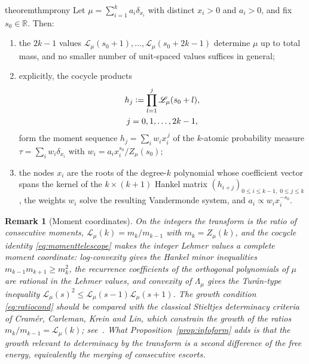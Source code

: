\documentclass[sn-mathphys-num]{sn-jnl}
\theoremstyle{thmstyleone}%
\theoremstyle{thmstyletwo}%
\newtheorem{remark}{Remark}%
\theoremstyle{thmstylethree}%
\theoremstyle{thmstyleone}%
\providecommand{\R}{\mathbb{R}}
\providecommand{\Leh}{\mathscr{L}}
\providecommand{\eqdef}{\mathrel{\vcentcolon=}}
\begin{document}
	\begin{restatable}{theorem}{thmprony}
		\label{thm:prony}
		Let $\mu=\sum_{i=1}^{k}a_i\delta_{x_i}$ with distinct $x_i>0$ and
		$a_i>0$, and fix $s_0\in\R$. Then:
		\begin{enumerate}[label=\textup{(\roman*)},leftmargin=2.2em]
			\item the $2k-1$ values
			$\Leh_\mu(s_0+1),\dots,\Leh_\mu(s_0+2k-1)$ determine $\mu$ up
			to total mass, and no smaller number of unit-spaced values
			suffices in general;
			\item explicitly, the cocycle products
			\begin{equation}\label{eq:hj}
				\begin{gathered}
					h_j\eqdef\prod_{l=1}^{j}\Leh_\mu(s_0+l),\\
					j=0,1,\dots,2k-1,
				\end{gathered}
			\end{equation}
			form the moment sequence $h_j=\sum_iw_ix_i^{\,j}$ of the
			$k$-atomic probability measure
			$\tau=\sum_iw_i\delta_{x_i}$ with
			$w_i=a_ix_i^{s_0}/Z_\mu(s_0)$;
			\item the nodes $x_i$ are the roots of the degree-$k$
			polynomial whose coefficient vector spans the kernel of the
			$k\times(k+1)$ Hankel matrix
			$(h_{i+j})_{0\le i\le k-1,\;0\le j\le k}$, the weights $w_i$
			solve the resulting Vandermonde system, and
			$a_i\propto w_ix_i^{-s_0}$.
		\end{enumerate}
	\end{restatable}
	
	\begin{remark}[Moment coordinates]\label{rem:hankel}
		On the integers the transform is the ratio of consecutive moments,
		$\Leh_\mu(k)=m_k/m_{k-1}$ with $m_k=Z_\mu(k)$, and the cocycle
		identity \eqref{eq:momenttelescope} makes the integer Lehmer
		values a complete moment coordinate: log-convexity gives the
		Hankel minor inequalities $m_{k-1}m_{k+1}\ge m_k^2$, the
		recurrence coefficients of the orthogonal polynomials of $\mu$
		are rational in the Lehmer values, and convexity of
		$\Lambda_\mu$ gives the Tur\'an-type inequality
		$\Leh_\mu(s)^2\le\Leh_\mu(s-1)\Leh_\mu(s+1)$. The growth
		condition \eqref{eq:ratiocond} should be compared with the
		classical Stieltjes determinacy criteria of Cram\'er, Carleman,
		Krein and Lin, which constrain the growth of the ratios
		$m_k/m_{k-1}=\Leh_\mu(k)$; see~\cite{linstoyanov2017}. What
		Proposition~\ref{prop:infoform} adds is that the growth relevant
		to determinacy by the transform is a second difference of the
		free energy, equivalently the merging of consecutive escorts.
	\end{remark}
	
\end{document}
